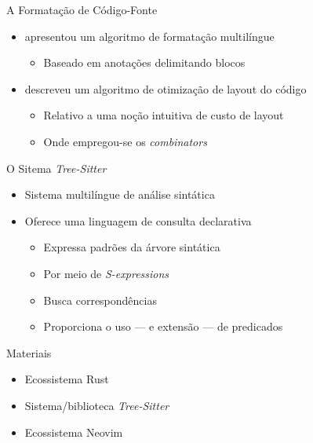 \documentclass
  [ aspectratio=169,
    english,
    hyperref={citecolor=blue,colorlinks=true,linkcolor=blue,urlcolor=blue},
    brazil]
  {beamer}
\newcommand{\treesitter}{\textit{Tree-Sitter}\xspace}
\begin{document}

  \begin{frame}{A Formatação de Código-Fonte}
    \begin{itemize}
      \item \textcite{oppen-1980-prettyprinting} apresentou um algoritmo
            de formatação multilíngue
            \begin{itemize}
              \item Baseado em anotações delimitando blocos
            \end{itemize}
      \item \textcite{yelland-2015-new} descreveu um algoritmo de otimização de
            layout do código
            \begin{itemize}
              \item Relativo a uma noção intuitiva de custo de layout
              \item Onde empregou-se os \textit{combinators}
            \end{itemize}
    \end{itemize}
  \end{frame}


  \begin{frame}{O Sitema \treesitter}
    \begin{itemize}
      \item Sistema multilíngue de análise sintática
      \item Oferece uma linguagem de consulta declarativa
            \begin{itemize}
              \item Expressa padrões da árvore sintática
              \item Por meio de \textit{S-expressions}
              \item Busca correspondências
              \item Proporciona o uso --- e extensão --- de predicados
            \end{itemize}
    \end{itemize}
  \end{frame}


  \begin{frame}{Materiais}
    \begin{itemize}
      \item Ecossistema Rust
      \item Sistema/biblioteca \treesitter \cite{tree-sitter-2023-tree}
      \item Ecossistema Neovim
    \end{itemize}
  \end{frame}
\end{document}
